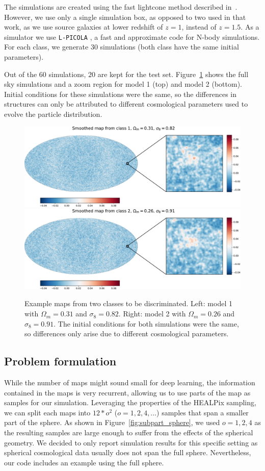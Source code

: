 \documentclass[final,twocolumn,3p,times,authoryear]{elsarticle}
\newcommand{\nati}[1]{{\color[rgb]{.1,.6,.1}{#1}}}
\newcommand{\figref}[1]{Figure~\ref{fig:#1}}
\newcommand{\1}{\b{1}}              %
\newcommand{\0}{\b{0}}              %
\newcommand{\pkg}[1]{\texttt{#1}}
\begin{document}
The simulations are created using the fast lightcone method described in~\citep{sgier2018fastgeneration}.
However, we use only a single simulation box, as opposed to two used in that work, as we use source galaxies at lower redshift of $z=1$, instead of $z=1.5$.
As a simulator we use \pkg{L-PICOLA} \citep{howlett2015lpicola}, a fast and approximate code for N-body simulations.
For each class, we generate $30$ simulations (both class have the same initial parameters).

Out of the $60$ simulations, $20$ are kept for the test set.
\figref{map_sample} shows the full sky simulations and a zoom region for model 1 (top) and model 2 (bottom).
Initial conditions for these simulations were the same, so the differences in structures can only be attributed to different cosmological parameters used to evolve the particle distribution.

\begin{figure}[!ht]
\centering
\includegraphics[width=0.48\linewidth]{figures/smooth_map_class_1.pdf}
\hfill
\includegraphics[width=0.48\linewidth]{figures/smooth_map_class_2.pdf}
\caption{Example maps from two classes to be discriminated. Left: model 1 with $\Omega_m=0.31$ and $\sigma_8=0.82$. Right: model 2 with $\Omega_m=0.26$ and $\sigma_8=0.91$.
The initial conditions for both simulations were the same, so differences only arise due to different cosmological parameters. \nati{Tomek: Is this correct?}}
\label{fig:map_sample}
\end{figure}



\subsection{Problem formulation}
While the number of maps might sound small for deep learning, the information contained in the maps is very recurrent, allowing us to use parts of the map as samples for our simulation.
Leveraging the properties of the HEALPix sampling, we can split each maps
into $12*o^2$ ($o=1,2,4,\dots$) samples that span a smaller part of the sphere.
As shown in \figref{subpart_sphere}, we used $o=1,2,4$ as the resulting
samples are large enough to suffer from the effects of the spherical geometry. We
decided to only report simulation results for this specific setting as spherical
cosmological data usually does not span the full sphere. Nevertheless, our code
includes an example using the full sphere.
\end{document}
